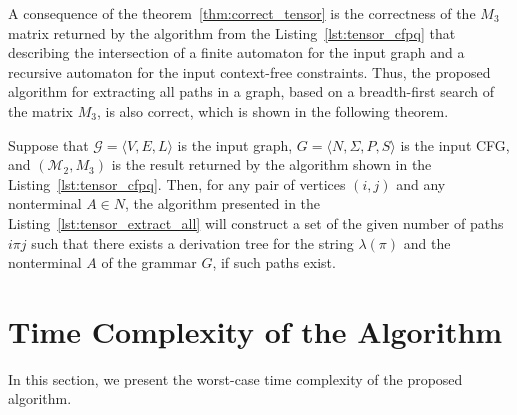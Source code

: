 A consequence of the theorem~\ref{thm:correct_tensor} is the correctness of the $M_3$ matrix returned by the algorithm from the Listing~\ref{lst:tensor_cfpq} that describing the intersection of a finite automaton for the input graph and a recursive automaton for the input context-free constraints. Thus, the proposed algorithm for extracting all paths in a graph, based on a breadth-first search of the matrix $M_3$, is also correct, which is shown in the following theorem.

\begin{theorem}\label{thm:correct_extraction_single_all_tensor}
	Suppose that $\mathcal{G} = \langle V, E, L \rangle$ is the input graph, $G = \langle N, \Sigma, P, S \rangle$ is the input CFG, and $(\mathcal{M}_2, M_3)$ is the result returned by the algorithm shown in the Listing~\ref{lst:tensor_cfpq}. Then, for any pair of vertices $(i, j)$ and any nonterminal $A \in N$, the algorithm presented in the Listing~\ref{lst:tensor_extract_all} will construct a set of the given number of paths $i \pi j$ such that there exists a derivation tree for the string $\lambda(\pi)$ and the nonterminal $A$ of the grammar $G$, if such paths exist.
\end{theorem}

\section{Time Complexity of the Algorithm}\label{sec:ch4/sect3}
In this section, we present the worst-case time complexity of the proposed algorithm.

